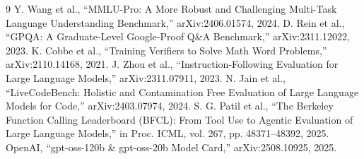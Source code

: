 \documentclass[11pt]{article}
\begin{document}
\begin{thebibliography}{9}
 Y. Wang et al., ``MMLU-Pro: A More Robust and Challenging Multi-Task Language Understanding Benchmark,'' arXiv:2406.01574, 2024.
 D. Rein et al., ``GPQA: A Graduate-Level Google-Proof Q\&A Benchmark,'' arXiv:2311.12022, 2023.
 K. Cobbe et al., ``Training Verifiers to Solve Math Word Problems,'' arXiv:2110.14168, 2021.
 J. Zhou et al., ``Instruction-Following Evaluation for Large Language Models,'' arXiv:2311.07911, 2023.
 N. Jain et al., ``LiveCodeBench: Holistic and Contamination Free Evaluation of Large Language Models for Code,'' arXiv:2403.07974, 2024.
 S. G. Patil et al., ``The Berkeley Function Calling Leaderboard (BFCL): From Tool Use to Agentic Evaluation of Large Language Models,'' in Proc. ICML, vol. 267, pp. 48371--48392, 2025.
 OpenAI, ``gpt-oss-120b \& gpt-oss-20b Model Card,'' arXiv:2508.10925, 2025.

\end{thebibliography}
\end{document}

